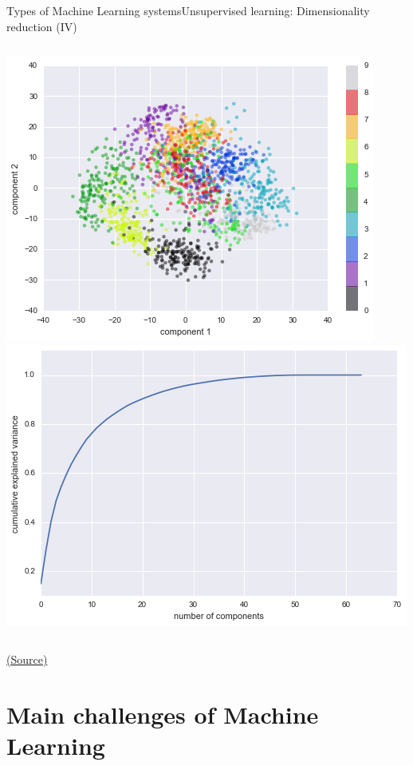 \documentclass[10pt,compress]{beamer} %
\begin{document}
\begin{frame}[fragile]{Types of Machine Learning systems}{Unsupervised learning: Dimensionality reduction (IV)}
    \begin{columns}
			\includegraphics[width=\linewidth]{figs/handdigitspca.png}
			\includegraphics[width=\linewidth]{figs/pcacomponents.png}
    \end{columns}

   	\centering \tiny{\href{https://github.com/amueller/introduction_to_ml_with_python/blob/master/03-unsupervised-learning.ipynb}{(Source)}}
\end{frame}

\section{Main challenges of Machine Learning}
\end{document}
